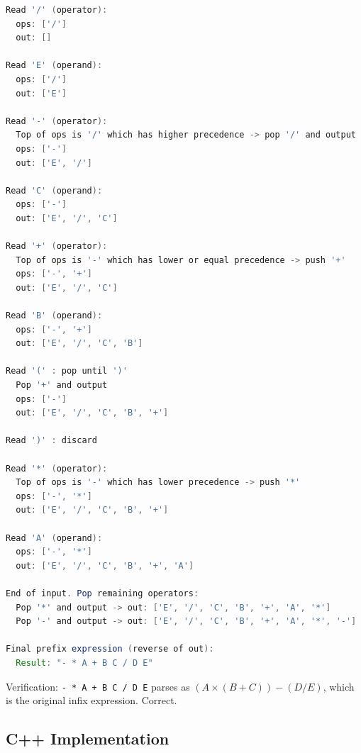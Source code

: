 \begin{lstlisting}[language=Java]
Read '/' (operator):
  ops: ['/']
  out: []

Read 'E' (operand):
  ops: ['/']
  out: ['E']

Read '-' (operator):
  Top of ops is '/' which has higher precedence -> pop '/' and output
  ops: ['-']
  out: ['E', '/']

Read 'C' (operand):
  ops: ['-']
  out: ['E', '/', 'C']

Read '+' (operator):
  Top of ops is '-' which has lower or equal precedence -> push '+'
  ops: ['-', '+']
  out: ['E', '/', 'C']

Read 'B' (operand):
  ops: ['-', '+']
  out: ['E', '/', 'C', 'B']

Read '(' : pop until ')'
  Pop '+' and output
  ops: ['-']
  out: ['E', '/', 'C', 'B', '+']

Read ')' : discard

Read '*' (operator):
  Top of ops is '-' which has lower precedence -> push '*'
  ops: ['-', '*']
  out: ['E', '/', 'C', 'B', '+']

Read 'A' (operand):
  ops: ['-', '*']
  out: ['E', '/', 'C', 'B', '+', 'A']

End of input. Pop remaining operators:
  Pop '*' and output -> out: ['E', '/', 'C', 'B', '+', 'A', '*']
  Pop '-' and output -> out: ['E', '/', 'C', 'B', '+', 'A', '*', '-']

Final prefix expression (reverse of out):
  Result: "- * A + B C / D E"
\end{lstlisting}

Verification: \texttt{- * A + B C / D E} parses as $(A \times (B + C)) - (D / E)$, which is the original infix expression. Correct.

\subsection{C++ Implementation}

